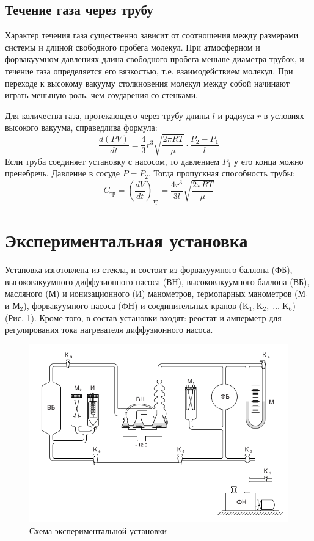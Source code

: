 \documentclass[12pt]{article}
\begin{document}
    \subsection{Течение газа через трубу}

	Характер течения газа существенно зависит от соотношения между размерами
	системы и длиной свободного пробега молекул. При атмосферном и форвакуумном
	давлениях  длина свободного пробега меньше диаметра трубок, и течение газа
	определяется его вязкостью, т.е. взаимодействием молекул. При переходе к
	высокому вакууму столкновения молекул между собой начинают играть меньшую
	роль, чем соударения со стенками.

	Для количества газа, протекающего через трубу длины $l$ и радиуса $r$ в
	условиях высокого вакуума, справедлива формула: \begin{equation}
	\frac{d(PV)}{dt} = \frac{4}{3}r^3\sqrt{\frac{2\pi RT}{\mu}}\cdot\frac{P_2 -
	P_1}{l} \end{equation} Если труба соединяет установку с насосом, то
	давлением $P_1$ у его конца можно пренебречь. Давление в сосуде $P = P_2$.
	Тогда пропускная способность трубы: \begin{equation} C_\text{тр} =
	\left(\frac{dV}{dt}\right)_\text{тр} = \frac{4r^3}{3l}\sqrt{\frac{2\pi
	RT}{\mu}} \label{ty} \end{equation}
	
    \section{Экспериментальная установка}
    
    Установка изготовлена из стекла,
	и состоит из форвакуумного баллона (ФБ), высоковакуумного диффузионного
	насоса (ВН), высоковакуумного баллона (ВБ), масляного (М) и ионизационного
	(И) манометров, термопарных манометров ($\text{М}_1$ и $\text{М}_2$),
	форвакуумного насоса (ФН) и соединительных кранов ($\text{K}_1,
	\text{K}_2,\; \ldots \;\text{K}_6$) (Рис. \ref{facility}). Кроме того, в
	состав установки входят: реостат и амперметр для регулирования тока
	нагревателя диффузионного насоса.
        
    \begin{figure}[H]
        \centering
        \includegraphics[scale=2]{stand.png}
        \caption{Схема экспериментальной установки}
        \label{facility}
    \end{figure}
    
\end{document}
